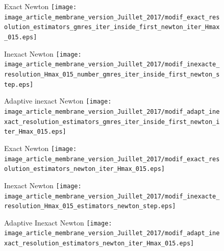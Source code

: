 \documentclass[10 pt]{beamer}
\begin{document}
\begin{frame}
\begin{figure}
\begin{minipage}[c]{.33\linewidth}
   \centering
   Exact Newton
\texttt{[image: image\_article\_membrane\_version\_Juillet\_2017/modif\_exact\_resolution\_estimators\_gmres\_iter\_inside\_first\_newton\_iter\_Hmax\_015.eps]}    
\end{minipage}\hfill
\begin{minipage}[c]{.33\linewidth}
   \centering
   Inexact Newton
\texttt{[image: image\_article\_membrane\_version\_Juillet\_2017/modif\_inexacte\_resolution\_Hmax\_015\_number\_gmres\_iter\_inside\_first\_newton\_step.eps]}    
\end{minipage}\hfill
\begin{minipage}[c]{.33\linewidth}
   \centering
   Adaptive inexact Newton
\texttt{[image: image\_article\_membrane\_version\_Juillet\_2017/modif\_adapt\_inexact\_resolution\_estimators\_gmres\_iter\_inside\_first\_newton\_iter\_Hmax\_015.eps]}     
\end{minipage}
\end{figure}

\vspace{-0.3 cm}
\begin{figure}
   \begin{minipage}[c]{.33\linewidth}
   \centering
   Exact  Newton 
\texttt{[image: image\_article\_membrane\_version\_Juillet\_2017/modif\_exact\_resolution\_estimators\_newton\_iter\_Hmax\_015.eps]}    
   \end{minipage} \hfill
   \begin{minipage}[c]{.33\linewidth}
   \centering
   Inexact Newton
\texttt{[image: image\_article\_membrane\_version\_Juillet\_2017/modif\_inexacte\_resolution\_Hmax\_015\_estimators\_newton\_step.eps]}     
   \end{minipage} \hfill
  \begin{minipage}[c]{.32\linewidth}
  \centering
  Adaptive Inexact Newton  
   \texttt{[image: image\_article\_membrane\_version\_Juillet\_2017/modif\_adapt\_inexact\_resolution\_estimators\_newton\_iter\_Hmax\_015.eps]}     
\end{minipage}\hfill
\end{figure}
\end{frame}
\end{document}
